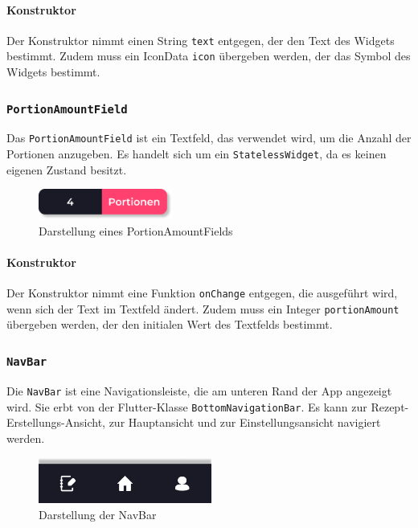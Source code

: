 \documentclass{entwurfsheft}
\begin{document}
\paragraph*{Konstruktor}
Der Konstruktor nimmt einen String \texttt{text} entgegen, der den Text des Widgets bestimmt. Zudem muss ein IconData \texttt{icon} übergeben werden, der das Symbol des Widgets bestimmt.

\subsubsection{\texttt{PortionAmountField}}
\label{sec:portionAmountField}
Das \texttt{PortionAmountField} ist ein Textfeld, das verwendet wird, um die Anzahl der Portionen anzugeben. Es handelt sich um ein \texttt{StatelessWidget}, da es keinen eigenen Zustand besitzt.
\begin{figure}[htp]
    \centering
    \includegraphics[height = 1cm]{images/presentationLayer/uiElements/portionAmountField.png}
    \caption{Darstellung eines PortionAmountFields}
\end{figure}
\paragraph*{Konstruktor}
Der Konstruktor nimmt eine Funktion \texttt{onChange} entgegen, die ausgeführt wird, wenn sich der Text im Textfeld ändert. Zudem muss ein Integer \texttt{portionAmount} übergeben werden, der den initialen Wert des Textfelds bestimmt.

\subsubsection{\texttt{NavBar}}
\label{sec:navBar}
Die \texttt{NavBar} ist eine Navigationsleiste, die am unteren Rand der App angezeigt wird. Sie erbt von der Flutter-Klasse \texttt{BottomNavigationBar}. Es kann zur Rezept-Erstellungs-Ansicht, zur Hauptansicht und zur Einstellungsansicht navigiert werden.
\begin{figure}[htp]
    \centering
    \includegraphics[height = 1.5cm]{images/presentationLayer/uiElements/navBar.png}
    \caption{Darstellung der NavBar}
\end{figure}
\newpage
\end{document}

